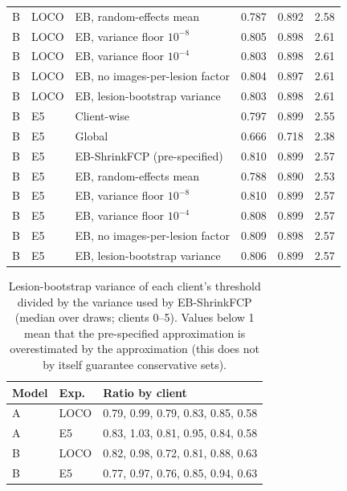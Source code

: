 \documentclass[10pt]{article}
\begin{document}
\begin{table}[!htbp]
\begin{tabular}{@{}lllrrr@{}}
B & LOCO & EB, random-effects mean & 0.787 & 0.892 & 2.58 \\
B & LOCO & EB, variance floor $10^{-8}$ & 0.805 & 0.898 & 2.61 \\
B & LOCO & EB, variance floor $10^{-4}$ & 0.803 & 0.898 & 2.61 \\
B & LOCO & EB, no images-per-lesion factor & 0.804 & 0.897 & 2.61 \\
B & LOCO & EB, lesion-bootstrap variance & 0.803 & 0.898 & 2.61 \\
\midrule
B & E5 & Client-wise & 0.797 & 0.899 & 2.55 \\
B & E5 & Global & 0.666 & 0.718 & 2.38 \\
B & E5 & EB-ShrinkFCP (pre-specified) & 0.810 & 0.899 & 2.57 \\
B & E5 & EB, random-effects mean & 0.788 & 0.890 & 2.53 \\
B & E5 & EB, variance floor $10^{-8}$ & 0.810 & 0.899 & 2.57 \\
B & E5 & EB, variance floor $10^{-4}$ & 0.808 & 0.899 & 2.57 \\
B & E5 & EB, no images-per-lesion factor & 0.809 & 0.898 & 2.57 \\
B & E5 & EB, lesion-bootstrap variance & 0.806 & 0.899 & 2.57 \\
\bottomrule
\end{tabular}
\end{table}
\begin{table}[!htbp]
\centering
\scriptsize
\caption{Lesion-bootstrap variance of each client's threshold divided by the variance used by EB-ShrinkFCP (median over draws; clients 0--5). Values below 1 mean that the pre-specified approximation is overestimated by the approximation (this does not by itself guarantee conservative sets).}
\label{tab:s15v}
\begin{tabular}{@{}llp{7cm}@{}}
\toprule
Model & Exp. & Ratio by client \\
\midrule
A & LOCO & 0.79, 0.99, 0.79, 0.83, 0.85, 0.58 \\
A & E5 & 0.83, 1.03, 0.81, 0.95, 0.84, 0.58 \\
B & LOCO & 0.82, 0.98, 0.72, 0.81, 0.88, 0.63 \\
B & E5 & 0.77, 0.97, 0.76, 0.85, 0.94, 0.63 \\
\bottomrule
\end{tabular}
\end{table}
\end{document}
